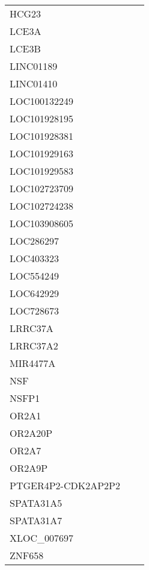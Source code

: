 \begin{tabular}{lcc}
HCG23              &                &            \\
LCE3A              &                &            \\
LCE3B              &                &            \\
LINC01189          &                &            \\
LINC01410          &                &            \\
LOC100132249       &                &            \\
LOC101928195       &                &            \\
LOC101928381       &                &            \\
LOC101929163       &                &            \\
LOC101929583       &                &            \\
LOC102723709       &                &            \\
LOC102724238       &                &            \\
LOC103908605       &                &            \\
LOC286297          &                &            \\
LOC403323          &                &            \\
LOC554249          &                &            \\
LOC642929          &                &            \\
LOC728673          &                &            \\
LRRC37A            &                &            \\
LRRC37A2           &                &            \\
MIR4477A           &                &            \\
NSF                &                &            \\
NSFP1              &                &            \\
OR2A1              &                &            \\
OR2A20P            &                &            \\
OR2A7              &                &            \\
OR2A9P             &                &            \\
PTGER4P2-CDK2AP2P2 &                &            \\
SPATA31A5          &                &            \\
SPATA31A7          &                &            \\
XLOC\_007697        &                &            \\
ZNF658             &                &            \\
\bottomrule
\end{tabular}
